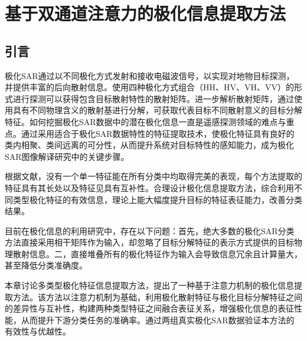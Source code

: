\chapter{基于双通道注意力的极化信息提取方法}
\section{引言}
极化SAR通过以不同极化方式发射和接收电磁波信号，以实现对地物目标探测，并提供丰富的后向散射信息。使用四种极化方式组合（HH、HV、VH、VV）的形式进行探测可以获得包含目标散射特性的散射矩阵。进一步解析散射矩阵，通过使用具有不同物理含义的散射基进行分解，可获取代表目标不同散射意义的目标分解特征。如何挖掘极化SAR数据中的潜在极化信息一直是遥感探测领域的难点与重点。通过采用适合于极化SAR数据特性的特征提取技术，使极化特征具有良好的类内相聚、类间远离的可分性，从而提升系统对目标特性的感知能力，成为极化SAR图像解译研究中的关键步骤。

根据文献\cite{刘高峰2014极化,1017062722.nh}，没有一个单一特征能在所有分类中均取得完美的表现，每个方法提取的特征具有其长处以及特征见具有互补性。合理设计极化信息提取方法，综合利用不同类型极化特征的有效信息，理论上能大幅度提升目标的特征表征能力，改善分类结果。


目前在极化信息的利用研究中，存在以下问题：首先，绝大多数的极化SAR分类方法直接采用相干矩阵作为输入，却忽略了目标分解特征的表示方式提供的目标物理散射信息。二，直接堆叠所有的极化特征作为输入会导致信息冗余且计算量大，甚至降低分类准确度。

本章讨论多类型极化特征信息提取方法，提出了一种基于注意力机制的极化信息提取方法。该方法以注意力机制为基础，利用极化散射特征与极化目标分解特征之间的差异性与互补性，构建两种类型特征之间融合表征关系，增强极化信息的表征性能，从而提升下游分类任务的准确率。通过两组真实极化SAR数据验证本方法的有效性与优越性。



